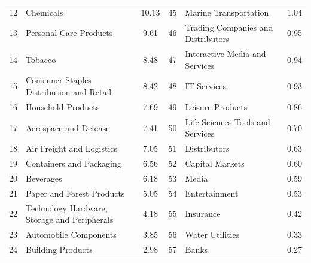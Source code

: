 \documentclass[12pt]{article}
\begin{document}
\begin{landscape}
\begin{table}[!ht]
\begin{tabular}{clcclc}
   12 &                                          Chemicals &               10.13 &    45 &                            Marine Transportation &                1.04 \\
   13 &                             Personal Care Products &                9.61 &    46 &               Trading Companies and Distributors &                0.95 \\
   14 &                                            Tobacco &                8.48 &    47 &                   Interactive Media and Services &                0.94 \\
   15 &           Consumer Staples Distribution and Retail &                8.42 &    48 &                                      IT Services &                0.93 \\
   16 &                                 Household Products &                7.69 &    49 &                                 Leisure Products &                0.86 \\
   17 &                              Aerospace and Defense &                7.41 &    50 &                 Life Sciences Tools and Services &                0.70 \\
   18 &                          Air Freight and Logistics &                7.05 &    51 &                                     Distributors &                0.63 \\
   19 &                           Containers and Packaging &                6.56 &    52 &                                  Capital Markets &                0.60 \\
   20 &                                          Beverages &                6.18 &    53 &                                            Media &                0.59 \\
   21 &                          Paper and Forest Products &                5.05 &    54 &                                    Entertainment &                0.53 \\
   22 &       Technology Hardware, Storage and Peripherals &                4.18 &    55 &                                        Insurance &                0.42 \\
   23 &                              Automobile Components &                3.85 &    56 &                                  Water Utilities &                0.33 \\
   24 &                                  Building Products &                2.98 &    57 &                                            Banks &                0.27 \\

\end{tabular}
\end{table}
\end{landscape}
\end{document}
